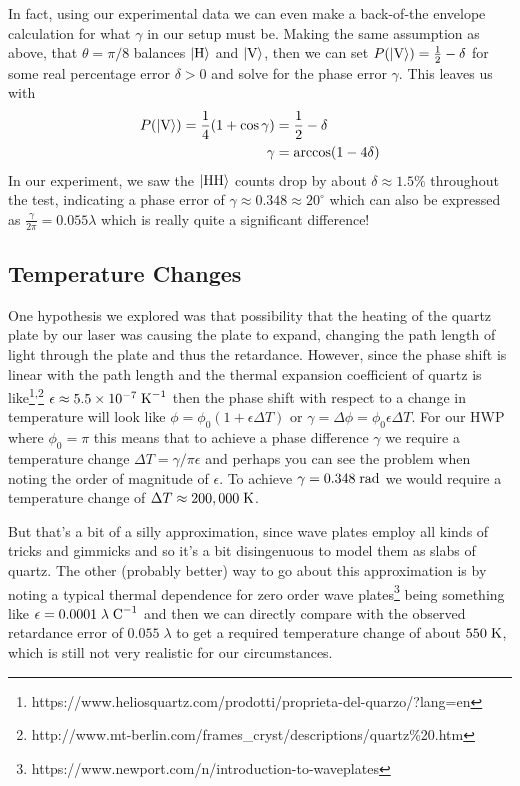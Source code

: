 In fact, using our experimental data we can even make a back-of-the envelope calculation for what $\gamma$ in our setup must be. Making the same assumption as above, that $\theta=\pi/8$ balances $\ket{\text{H}}$ and $\ket{\text{V}}$, then we can set $P(\ket{\text{V}})=\frac{1}{2}-\delta$ for some real percentage error $\delta > 0$ and solve for the phase error $\gamma$. This leaves us with
\begin{align}
	P(\ket{\text{V}})=\frac{1}{4}(1+\cos\gamma) &= \frac{1}{2} - \delta \\
	\gamma &= \arccos(1 - 4\delta)
\end{align}
In our experiment, we saw the $\ket{\text{HH}}$ counts drop by about $\delta \approx 1.5\%$ throughout the test, indicating a phase error of $\gamma\approx 0.348\approx 20^\circ$ which can also be expressed as $\frac{\gamma}{2\pi} = 0.055\lambda$ which is really quite a significant difference!

\subsection{Temperature Changes}

One hypothesis we explored was that possibility that the heating of the quartz plate by our laser was causing the plate to expand, changing the path length of light through the plate and thus the retardance. However, since the phase shift is linear with the path length and the thermal expansion coefficient of quartz is like\footnote{https://www.heliosquartz.com/prodotti/proprieta-del-quarzo/?lang=en}\textsuperscript{,}\footnote{http://www.mt-berlin.com/frames\_cryst/descriptions/quartz\%20.htm} $\epsilon \approx 5.5\times 10^{-7} \;{\text{K}}^{-1}$ then the phase shift with respect to a change in temperature will look like $\phi = \phi_0(1+\epsilon\Delta T)$ or $\gamma = \Delta \phi = \phi_0\epsilon\Delta T$. For our HWP where $\phi_0=\pi$ this means that to achieve a phase difference $\gamma$ we require a temperature change $\Delta T= \gamma/\pi\epsilon$ and perhaps you can see the problem when noting the order of magnitude of $\epsilon$. To achieve $\gamma=0.348\;{\text{rad}}$ we would require a temperature change of $\Delta T \approx 200,000 \;{\text{K}}$.

But that's a bit of a silly approximation, since wave plates employ all kinds of tricks and gimmicks and so it's a bit disingenuous to model them as slabs of quartz. The other (probably better) way to go about this approximation is by noting a typical thermal dependence for zero order wave plates\footnote{https://www.newport.com/n/introduction-to-waveplates} being something like $\epsilon=0.0001\;\lambda\;{\text{C}}^{-1}$ and then we can directly compare with the observed retardance error of $0.055\;\lambda$ to get a required temperature change of about $550\;{\text{K}}$, which is still not very realistic for our circumstances.

